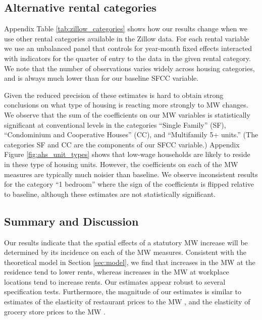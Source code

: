 \subsection{Alternative rental categories}

Appendix Table \ref{tab:zillow_categories} shows how our results change when we 
use other rental categories available in the Zillow data.
For each rental variable we use an unbalanced panel that controls for
year-month fixed effects interacted with indicators for the quarter of entry
to the data in the given rental category.
We note that the number of observations varies widely across housing categories, 
and is always much lower than for our baseline SFCC variable.

Given the reduced precision of these estimates is hard to obtain strong 
conclusions on what type of housing is reacting more strongly to MW changes.
We observe that the sum of the coefficients on our MW variables is 
statistically significant at conventional levels in the categories 
``Single Family'' (SF),  ``Condominium and Cooperative Houses'' (CC), and 
``Multifamily 5+ units.''
(The categories SF and CC are the components of our SFCC variable.)
Appendix Figure \ref{fig:ahs_unit_types} shows that low-wage households are 
likely to reside in these type of housing units.
However, the coefficients on each of the MW measures are typically much noisier 
than baseline.
We observe inconsistent results for the category ``1 bedroom'' where the sign 
of the coefficients is flipped relative to baseline, although these estimates 
are not statistically significant.

\subsection{Summary and Discussion}
\label{sec:results_discussion}

Our results indicate that the spatial effects of a statutory MW increase will 
be determined by its incidence on each of the MW measures.
Consistent with the theoretical model in Section \ref{sec:model}, we find that 
increases in the MW at the residence tend to lower rents, whereas increases 
in the MW at workplace locations tend to increase rents.
Our estimates appear robust to several specification tests.
Furthermore, the magnitude of our estimates is similar to estimates of the
elasticity of restaurant prices to the MW \parencite{AllegrettoReich2018},
and the elasticity of grocery store prices to the MW 
\parencite{RenkinEtAl2020, Leung2021}.

